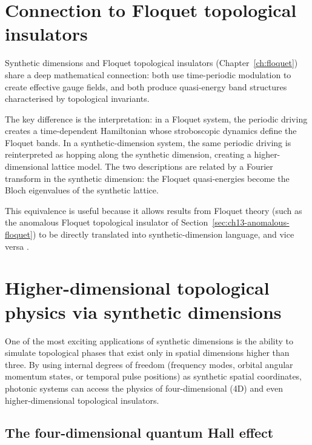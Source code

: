 \section{Connection to Floquet topological insulators}
\label{sec:ch16-floquet-bridge}

Synthetic dimensions and Floquet topological insulators
(Chapter~\ref{ch:floquet}) share a deep mathematical connection: both
use time-periodic modulation to create effective gauge fields, and
both produce quasi-energy band structures characterised by topological
invariants.

The key difference is the interpretation: in a Floquet system, the
periodic driving creates a time-dependent Hamiltonian whose stroboscopic
dynamics define the Floquet bands.  In a synthetic-dimension system,
the same periodic driving is reinterpreted as hopping along the
synthetic dimension, creating a higher-dimensional lattice model.
The two descriptions are related by a Fourier transform in the
synthetic dimension: the Floquet quasi-energies become the Bloch
eigenvalues of the synthetic lattice.

This equivalence is useful because it allows results from Floquet
theory (such as the anomalous Floquet topological insulator of
Section~\ref{sec:ch13-anomalous-floquet}) to be directly translated
into synthetic-dimension language, and vice versa
\cite{ozawa2018topological,kitagawa2010topological}.

\section{Higher-dimensional topological physics via synthetic dimensions}
\label{sec:ch16-higher-dimensional}

One of the most exciting applications of synthetic dimensions is the
ability to simulate topological phases that exist only in spatial
dimensions higher than three.  By using internal degrees of freedom
(frequency modes, orbital angular momentum states, or temporal
pulse positions) as synthetic spatial coordinates, photonic systems
can access the physics of four-dimensional (4D) and even
higher-dimensional topological insulators.

\subsection{The four-dimensional quantum Hall effect}
\label{sec:ch16-4d-qhe-photonic}

